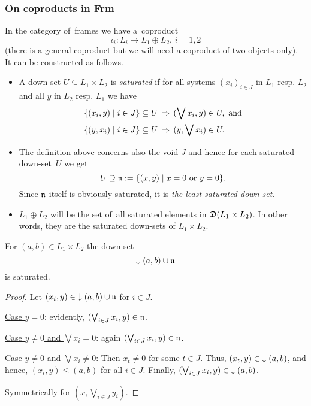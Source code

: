 \subsubsection*{On coproducts in Frm}

In the category of~frames we have a~coproduct
\[
  \iota_i: L_i \to L_1 \oplus L_2, \, i = 1, 2
\]
(there is a general coproduct but we will need a coproduct of two objects
 only).
It can be constructed as follows.

\begin{itemize}
\item
{} \label{df:satur}
A down-set $U\subseteq L_1 \times L_2$ is \emph{saturated\/} if for all systems
$(x_i)_{i\in J}$ in $L_1$ resp. $L_2$ and all $y$ in $L_2$ resp. $L_1$ we have
  \begin{align*}
    \{ (x_i, y) \mid i\in J \} \subseteq U \, &\Rightarrow \, (\bigvee x_i, y)\in U,
    \text{ and} \\
    \{ (y, x_i) \mid i\in J \} \subseteq U \, &\Rightarrow \, (y, \bigvee x_i)\in U.
  \end{align*}

\item The definition above concerns also the void $J$ and hence for each
saturated down-set~$U$ we get
\[
  U\supseteq \mathfrak{n} := \{ (x, y) \mid x = 0 \text{ or } y = 0 \}.
\]
Since $\mathfrak{n}$ itself is obviously saturated, it is \emph{the least saturated
down-set\/}.

\item $L_1 \oplus L_2$ will be the set of~all saturated elements in $\mathfrak{D}(L_1
\times L_2)$.
In other words, they are the saturated down-sets of $L_1 \times L_2$.
\end{itemize}

\begin{prop}
For $(a, b)\in L_1 \times L_2$ the down-set
\[
  \left\downarrow\right. (a, b) \cup \mathfrak{n}
\]
is saturated.
\end{prop}
\begin{proof}
  Let $(x_i, y)\in \left\downarrow\right. (a, b) \cup \mathfrak{n}$ for $i\in J$.

  \underline{Case $y = 0$}:
  evidently, $(\bigvee_{i\in J} x_i, y) \in \mathfrak{n}$.

  \underline{Case $y \ne 0$ and $\bigvee x_i = 0$}:
  again $(\bigvee_{i\in J} x_i, y) \in \mathfrak{n}$.

  \underline{Case $y \ne 0$ and $\bigvee x_i \ne 0$}:
  Then $x_t \ne 0$ for some $t\in J$.
  Thus, $(x_t, y)\in \left\downarrow\right. (a, b)$, and hence, $(x_i, y) \le (a, b)$ for all
  $i\in J$.
  Finally, $(\bigvee_{i\in J} x_i, y) \in \left\downarrow\right. (a, b)$.

  Symmetrically for $(x, \bigvee_{i\in J} y_i)$.
\end{proof}

